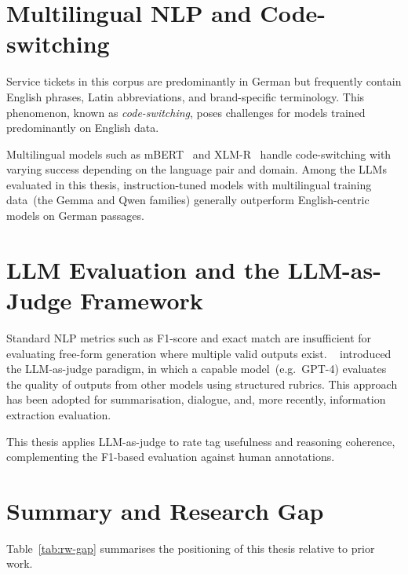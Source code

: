 \section{Multilingual NLP and Code-switching}
\label{sec:rw-multilingual}
%
Service tickets in this corpus are predominantly in German but frequently contain
English phrases, Latin abbreviations, and brand-specific terminology.
This phenomenon, known as \emph{code-switching}, poses challenges for models
trained predominantly on English data.

Multilingual models such as mBERT~\cite{devlin2019bert} and
XLM-R~\cite{conneau2020unsupervised} handle code-switching with varying success
depending on the language pair and domain.  Among the LLMs evaluated in this
thesis, instruction-tuned models with multilingual training data~(the Gemma
and Qwen families) generally outperform English-centric models on German
passages.

\section{LLM Evaluation and the LLM-as-Judge Framework}
\label{sec:rw-judge}
%
Standard NLP metrics such as F1-score and exact match are insufficient for
evaluating free-form generation where multiple valid outputs exist.
\citeauthor{zheng2024judging}~\cite{zheng2024judging} introduced the
LLM-as-judge paradigm, in which a capable model~(e.g.~GPT-4) evaluates the
quality of outputs from other models using structured rubrics.  This approach
has been adopted for summarisation, dialogue, and, more recently, information
extraction evaluation.

This thesis applies LLM-as-judge to rate tag usefulness and reasoning coherence,
complementing the F1-based evaluation against human annotations.

\section{Summary and Research Gap}
\label{sec:rw-gap}
%
Table~\ref{tab:rw-gap} summarises the positioning of this thesis relative to
prior work.


